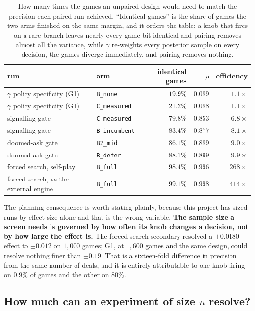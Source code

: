 \documentclass[11pt,letterpaper]{article}
\begin{document}
\begin{table}[t]
\centering
\begin{tabular}{llrrr}
\toprule
run & arm & identical games & $\rho$ & efficiency \\
\midrule
$\gamma$ policy specificity (G1) & \texttt{B\_none} & $19.9\%$ & $0.089$ & $1.1\times$ \\
$\gamma$ policy specificity (G1) & \texttt{C\_measured} & $21.2\%$ & $0.088$ & $1.1\times$ \\
signalling gate & \texttt{C\_measured} & $79.8\%$ & $0.853$ & $6.8\times$ \\
signalling gate & \texttt{B\_incumbent} & $83.4\%$ & $0.877$ & $8.1\times$ \\
doomed-ask gate & \texttt{B2\_mid} & $86.1\%$ & $0.889$ & $9.0\times$ \\
doomed-ask gate & \texttt{B\_defer} & $88.1\%$ & $0.899$ & $9.9\times$ \\
forced search, self-play & \texttt{B\_full} & $98.4\%$ & $0.996$ & $268\times$ \\
forced search, vs the external engine & \texttt{B\_full} & $99.1\%$ & $0.998$ & $414\times$ \\
\bottomrule
\end{tabular}
\caption{How many times the games an unpaired design would need to match the
precision each paired run achieved. ``Identical games'' is the share of games
the two arms finished on the same margin, and it orders the table: a knob that
fires on a rare branch leaves nearly every game bit-identical and pairing
removes almost all the variance, while $\gamma$ re-weights every posterior
sample on every decision, the games diverge immediately, and pairing removes
nothing.}
\label{tab:pairing}
\end{table}

The planning consequence is worth stating plainly, because this project has
sized runs by effect size alone and that is the wrong variable. \textbf{The
sample size a screen needs is governed by how often its knob changes a
decision, not by how large the effect is.} The forced-search secondary
resolved a $+0.0180$ effect to $\pm 0.012$ on $1{,}000$ games; G1, at $1{,}600$
games and the same design, could resolve nothing finer than $\pm 0.19$. That is
a sixteen-fold difference in precision from the same number of deals, and it
is entirely attributable to one knob firing on $0.9\%$ of games and the other
on $80\%$.

\subsection{How much can an experiment of size \texorpdfstring{$n$}{n} resolve?}
\end{document}
